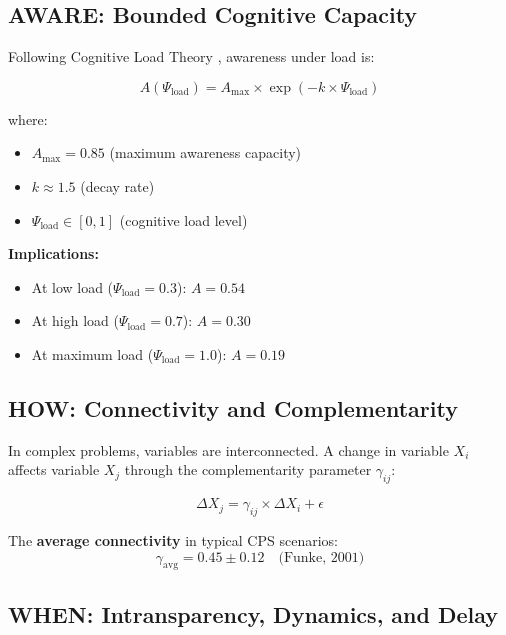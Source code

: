 \subsection{AWARE: Bounded Cognitive Capacity}
\label{sec:cps-aware}

Following Cognitive Load Theory \citep{sweller1988cognitiveload}, awareness under load is:

\begin{equation}
A(\Psi_{\text{load}}) = A_{\max} \times \exp(-k \times \Psi_{\text{load}})
\label{eq:awareness-load}
\end{equation}

where:
\begin{itemize}
\item $A_{\max} = 0.85$ (maximum awareness capacity)
\item $k \approx 1.5$ (decay rate)
\item $\Psi_{\text{load}} \in [0,1]$ (cognitive load level)
\end{itemize}

\textbf{Implications:}
\begin{itemize}
\item At low load ($\Psi_{\text{load}} = 0.3$): $A = 0.54$
\item At high load ($\Psi_{\text{load}} = 0.7$): $A = 0.30$
\item At maximum load ($\Psi_{\text{load}} = 1.0$): $A = 0.19$
\end{itemize}


\subsection{HOW: Connectivity and Complementarity}
\label{sec:cps-how}

In complex problems, variables are interconnected. A change in variable $X_i$ affects variable $X_j$ through the complementarity parameter $\gamma_{ij}$:

\begin{equation}
\Delta X_j = \gamma_{ij} \times \Delta X_i + \epsilon
\end{equation}

The \textbf{average connectivity} in typical CPS scenarios:
\begin{equation}
\gamma_{\text{avg}} = 0.45 \pm 0.12 \quad \text{(Funke, 2001)}
\end{equation}


\subsection{WHEN: Intransparency, Dynamics, and Delay}
\label{sec:cps-when}

